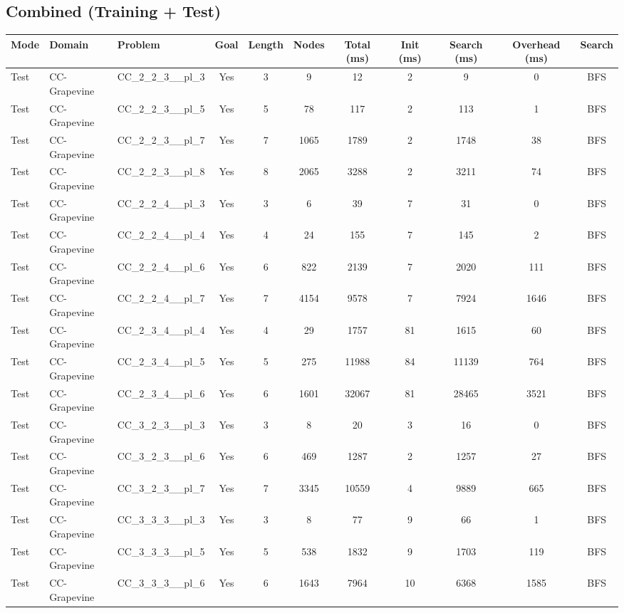 \documentclass{article}
\begin{document}
\subsection*{Combined (Training + Test)}
\begin{tabular}{lllcccccccc}
\toprule
Mode & Domain & Problem & Goal & Length & Nodes & Total (ms) & Init (ms) & Search (ms) & Overhead (ms) & Search \\
\midrule
Test & CC-Grapevine & CC\_2\_2\_3\_\_pl\_3 & Yes & 3 & 9 & 12 & 2 & 9 & 0 & BFS \\
Test & CC-Grapevine & CC\_2\_2\_3\_\_pl\_5 & Yes & 5 & 78 & 117 & 2 & 113 & 1 & BFS \\
Test & CC-Grapevine & CC\_2\_2\_3\_\_pl\_7 & Yes & 7 & 1065 & 1789 & 2 & 1748 & 38 & BFS \\
Test & CC-Grapevine & CC\_2\_2\_3\_\_pl\_8 & Yes & 8 & 2065 & 3288 & 2 & 3211 & 74 & BFS \\
Test & CC-Grapevine & CC\_2\_2\_4\_\_pl\_3 & Yes & 3 & 6 & 39 & 7 & 31 & 0 & BFS \\
Test & CC-Grapevine & CC\_2\_2\_4\_\_pl\_4 & Yes & 4 & 24 & 155 & 7 & 145 & 2 & BFS \\
Test & CC-Grapevine & CC\_2\_2\_4\_\_pl\_6 & Yes & 6 & 822 & 2139 & 7 & 2020 & 111 & BFS \\
Test & CC-Grapevine & CC\_2\_2\_4\_\_pl\_7 & Yes & 7 & 4154 & 9578 & 7 & 7924 & 1646 & BFS \\
Test & CC-Grapevine & CC\_2\_3\_4\_\_pl\_4 & Yes & 4 & 29 & 1757 & 81 & 1615 & 60 & BFS \\
Test & CC-Grapevine & CC\_2\_3\_4\_\_pl\_5 & Yes & 5 & 275 & 11988 & 84 & 11139 & 764 & BFS \\
Test & CC-Grapevine & CC\_2\_3\_4\_\_pl\_6 & Yes & 6 & 1601 & 32067 & 81 & 28465 & 3521 & BFS \\
Test & CC-Grapevine & CC\_3\_2\_3\_\_pl\_3 & Yes & 3 & 8 & 20 & 3 & 16 & 0 & BFS \\
Test & CC-Grapevine & CC\_3\_2\_3\_\_pl\_6 & Yes & 6 & 469 & 1287 & 2 & 1257 & 27 & BFS \\
Test & CC-Grapevine & CC\_3\_2\_3\_\_pl\_7 & Yes & 7 & 3345 & 10559 & 4 & 9889 & 665 & BFS \\
Test & CC-Grapevine & CC\_3\_3\_3\_\_pl\_3 & Yes & 3 & 8 & 77 & 9 & 66 & 1 & BFS \\
Test & CC-Grapevine & CC\_3\_3\_3\_\_pl\_5 & Yes & 5 & 538 & 1832 & 9 & 1703 & 119 & BFS \\
Test & CC-Grapevine & CC\_3\_3\_3\_\_pl\_6 & Yes & 6 & 1643 & 7964 & 10 & 6368 & 1585 & BFS \\

\end{tabular}
\end{document}
